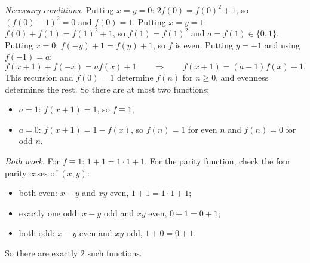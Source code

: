 \emph{Necessary conditions.} Putting $x=y=0$: $2f(0)=f(0)^2+1$, so $(f(0)-1)^2=0$ and $f(0)=1$. Putting $x=y=1$: $f(0)+f(1)=f(1)^2+1$, so $f(1)=f(1)^2$ and $a=f(1)\in\{0,1\}$. Putting $x=0$: $f(-y)+1=f(y)+1$, so $f$ is even. Putting $y=-1$ and using $f(-1)=a$:
\[f(x+1)+f(-x)=af(x)+1\qquad\Longrightarrow\qquad f(x+1)=(a-1)f(x)+1.\]
This recursion and $f(0)=1$ determine $f(n)$ for $n\ge0$, and evenness determines the rest. So there are at most two functions:
\begin{itemize}
\item $a=1$: $f(x+1)=1$, so $f\equiv1$;
\item $a=0$: $f(x+1)=1-f(x)$, so $f(n)=1$ for even $n$ and $f(n)=0$ for odd $n$.
\end{itemize}

\emph{Both work.} For $f\equiv1$: $1+1=1\cdot1+1$. For the parity function, check the four parity cases of $(x,y)$:
\begin{itemize}
\item both even: $x-y$ and $xy$ even, $1+1=1\cdot1+1$;
\item exactly one odd: $x-y$ odd and $xy$ even, $0+1=0+1$;
\item both odd: $x-y$ even and $xy$ odd, $1+0=0+1$.
\end{itemize}
So there are exactly $\boxed{2}$ such functions.
